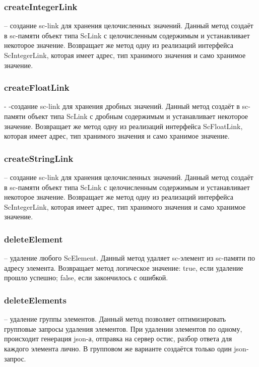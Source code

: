 \subsubsection {createIntegerLink} -- создание sc-link для хранения целочисленных значений. Данный метод создаёт в sc-памяти объект типа ScLink с целочисленным содержимым и устанавливает некоторое значение. Возвращает же метод одну из реализаций интерфейса {ScIntegerLink}, которая имеет адрес, тип хранимого значения и само хранимое значение. 
\subsubsection {createFloatLink} - -создание sc-link для хранения дробных значений. Данный метод создаёт в sc-памяти объект типа ScLink с дробным содержимым и устанавливает некоторое значение. Возвращает же метод одну из реализаций интерфейса ScFloatLink, которая имеет адрес, тип хранимого значения и само хранимое значение. 
\subsubsection {createStringLink} -- создание sc-link для хранения целочисленных значений. Данный метод создаёт в sc-памяти объект типа ScLink с целочисленным содержимым и устанавливает некоторое значение. Возвращает же метод одну из реализаций интерфейса ScIntegerLink, которая имеет адрес, тип хранимого значения и само хранимое значение. 
\subsubsection {deleteElement} -- удаление любого ScElement. Данный метод удаляет sc-элемент из sc-памяти по адресу элемента. Возвращает метод логическое значение: true, если удаление прошло успешно; false, если закончилось с ошибкой. 
\subsubsection {deleteElements} -- удаление группы элементов. Данный метод позволяет оптимизировать групповые запросы удаления элементов. При удалении элементов по одному, происходит генерация json-а, отправка на сервер остис, разбор ответа для каждого элемента лично. В групповом же варианте создаётся только один json-запрос. 
